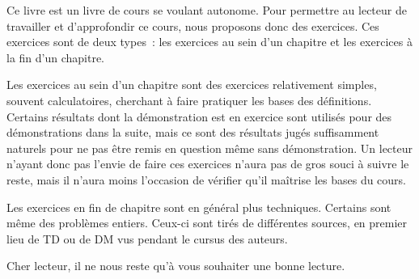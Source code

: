 Ce livre est un livre de cours se voulant autonome. Pour permettre au lecteur de
travailler et d'approfondir ce cours, nous proposons donc des exercices. Ces
exercices sont de deux types~: les exercices au sein d'un chapitre et les
exercices à la fin d'un chapitre.

Les exercices au sein d'un chapitre sont des exercices relativement simples,
souvent calculatoires, cherchant à faire pratiquer les bases des définitions.
Certains résultats dont la démonstration est en exercice sont utilisés pour des
démonstrations dans la suite, mais ce sont des résultats jugés suffisamment
naturels pour ne pas être remis en question même sans démonstration. Un lecteur
n'ayant donc pas l'envie de faire ces exercices n'aura pas de gros souci à
suivre le reste, mais il n'aura moins l'occasion de vérifier qu'il maîtrise les
bases du cours.

Les exercices en fin de chapitre sont en général plus techniques. Certains sont
même des problèmes entiers. Ceux-ci sont tirés de différentes sources, en
premier lieu de TD ou de DM vus pendant le cursus des auteurs.

Cher lecteur, il ne nous reste qu'à vous souhaiter une bonne lecture.
